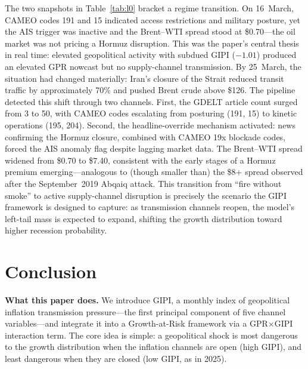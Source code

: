 \documentclass[12pt]{article}
\begin{document}
The two snapshots in Table~\ref{tab:l0} bracket a regime transition.
On 16~March, CAMEO codes 191 and 15 indicated access restrictions and
military posture, yet the AIS trigger was inactive and the Brent--WTI
spread stood at \$0.70---the oil market was not pricing a Hormuz disruption.
This was the paper's central thesis in real time: elevated geopolitical
activity with subdued GIPI ($-1.01$) produced an elevated GPR nowcast
but no supply-channel transmission.
By 25~March, the situation had changed materially: Iran's closure of the
Strait reduced transit traffic by approximately 70\% and pushed Brent
crude above \$126.
The pipeline detected this shift through two channels.
First, the GDELT article count surged from 3 to 50, with CAMEO codes
escalating from posturing (191, 15) to kinetic operations (195, 204).
Second, the headline-override mechanism activated: news confirming the
Hormuz closure, combined with CAMEO 19x blockade codes, forced the AIS
anomaly flag despite lagging market data.
The Brent--WTI spread widened from \$0.70 to \$7.40, consistent with
the early stages of a Hormuz premium emerging---analogous to (though
smaller than) the \$8+ spread observed after the September~2019 Abqaiq
attack.
This transition from ``fire without smoke'' to active supply-channel
disruption is precisely the scenario the GIPI framework is designed to
capture: as transmission channels reopen, the model's left-tail mass
is expected to expand, shifting the growth distribution toward higher
recession probability.

\section{Conclusion}\label{sec:conclude}

\noindent\textbf{What this paper does.}
We introduce GIPI, a monthly index of geopolitical inflation transmission
pressure---the first principal component of five channel variables---and
integrate it into a Growth-at-Risk framework via a GPR$\times$GIPI
interaction term.
The core idea is simple: a geopolitical shock is most dangerous to the
growth distribution when the inflation channels are open (high GIPI), and
least dangerous when they are closed (low GIPI, as in 2025).
\end{document}
